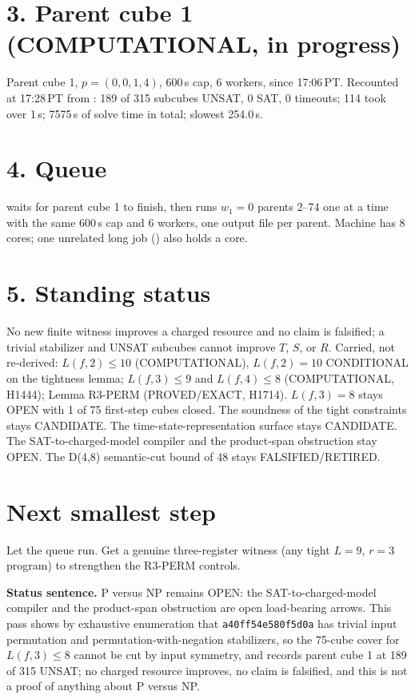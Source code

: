 \documentclass[11pt]{article}
\begin{document}
\section*{3. Parent cube 1 (COMPUTATIONAL, in progress)}
Parent cube 1, $p=(0,0,1,4)$, 600\,s cap, 6 workers, since 17:06\,PT. Recounted at 17:28\,PT from : 189 of 315 subcubes UNSAT, 0 SAT, 0 timeouts; 114 took over 1\,s; 7575\,s of solve time in total; slowest 254.0\,s.

\section*{4. Queue}
 waits for parent cube 1 to finish, then runs $w_1=0$ parents 2--74 one at a time with the same 600\,s cap and 6 workers, one output file per parent. Machine has 8 cores; one unrelated long job () also holds a core.

\section*{5. Standing status}
No new finite witness improves a charged resource and no claim is falsified; a trivial stabilizer and UNSAT subcubes cannot improve $T$, $S$, or $R$. Carried, not re-derived: $L(f,2)\le 10$ (COMPUTATIONAL), $L(f,2)=10$ CONDITIONAL on the tightness lemma; $L(f,3)\le 9$ and $L(f,4)\le 8$ (COMPUTATIONAL, H1444); Lemma R3-PERM (PROVED/EXACT, H1714). $L(f,3)=8$ stays OPEN with 1 of 75 first-step cubes closed. The soundness of the tight constraints stays CANDIDATE. The time-state-representation surface stays CANDIDATE. The SAT-to-charged-model compiler and the product-span obstruction stay OPEN. The D(4,8) semantic-cut bound of 48 stays FALSIFIED/RETIRED.

\section*{Next smallest step}
Let the queue run. Get a genuine three-register witness (any tight $L=9$, $r=3$ program) to strengthen the R3-PERM controls.

\bigskip
\noindent\textbf{Status sentence.} P versus NP remains OPEN: the SAT-to-charged-model compiler and the product-span obstruction are open load-bearing arrows. This pass shows by exhaustive enumeration that \texttt{a40ff54e580f5d0a} has trivial input permutation and permutation-with-negation stabilizers, so the 75-cube cover for $L(f,3)\le 8$ cannot be cut by input symmetry, and records parent cube 1 at 189 of 315 UNSAT; no charged resource improves, no claim is falsified, and this is not a proof of anything about P versus NP.
\end{document}
